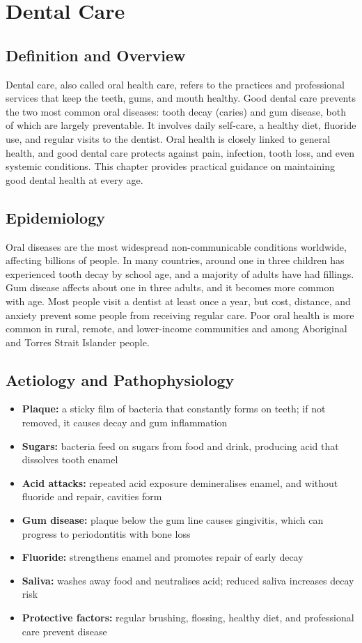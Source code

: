\chapter{Dental Care}

\section*{Definition and Overview}
Dental care, also called oral health care, refers to the practices and professional services that keep the teeth, gums, and mouth healthy. Good dental care prevents the two most common oral diseases: tooth decay (caries) and gum disease, both of which are largely preventable. It involves daily self-care, a healthy diet, fluoride use, and regular visits to the dentist. Oral health is closely linked to general health, and good dental care protects against pain, infection, tooth loss, and even systemic conditions. This chapter provides practical guidance on maintaining good dental health at every age.

\section*{Epidemiology}
Oral diseases are the most widespread non-communicable conditions worldwide, affecting billions of people. In many countries, around one in three children has experienced tooth decay by school age, and a majority of adults have had fillings. Gum disease affects about one in three adults, and it becomes more common with age. Most people visit a dentist at least once a year, but cost, distance, and anxiety prevent some people from receiving regular care. Poor oral health is more common in rural, remote, and lower-income communities and among Aboriginal and Torres Strait Islander people.

\section*{Aetiology and Pathophysiology}
\begin{itemize}
    \item \textbf{Plaque:} a sticky film of bacteria that constantly forms on teeth; if not removed, it causes decay and gum inflammation
    \item \textbf{Sugars:} bacteria feed on sugars from food and drink, producing acid that dissolves tooth enamel
    \item \textbf{Acid attacks:} repeated acid exposure demineralises enamel, and without fluoride and repair, cavities form
    \item \textbf{Gum disease:} plaque below the gum line causes gingivitis, which can progress to periodontitis with bone loss
    \item \textbf{Fluoride:} strengthens enamel and promotes repair of early decay
    \item \textbf{Saliva:} washes away food and neutralises acid; reduced saliva increases decay risk
    \item \textbf{Protective factors:} regular brushing, flossing, healthy diet, and professional care prevent disease
\end{itemize}

